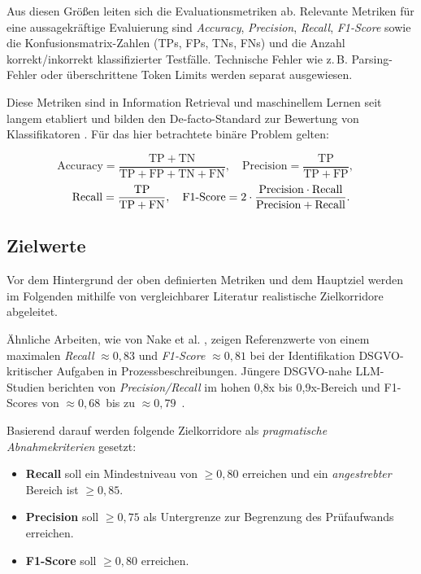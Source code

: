 Aus diesen Größen leiten sich die Evaluationsmetriken ab. Relevante Metriken für eine aussagekräftige Evaluierung sind \emph{Accuracy}, \emph{Precision}, \emph{Recall}, \emph{F1-Score} sowie die Konfusionsmatrix-Zahlen (\acp{TP}, \acp{FP}, \acp{TN}, \acp{FN}) und die Anzahl korrekt/inkorrekt klassifizierter Testfälle. Technische Fehler wie z.\,B. Parsing-Fehler oder überschrittene Token Limits werden separat ausgewiesen.

Diese Metriken sind in Information Retrieval und maschinellem Lernen seit langem etabliert und bilden den De-facto-Standard zur Bewertung von Klassifikatoren \cite{manning2008ir, nake2023towards, sokolova2009measureclassification}. Für das hier betrachtete binäre Problem gelten:

\[
    \mathrm{Accuracy}=\frac{\mathrm{TP}+\mathrm{TN}}{\mathrm{TP}+\mathrm{FP}+\mathrm{TN}+\mathrm{FN}},\quad
    \mathrm{Precision}=\frac{\mathrm{TP}}{\mathrm{TP}+\mathrm{FP}},\quad
\]
\vspace{0.5em}
\[
    \mathrm{Recall}=\frac{\mathrm{TP}}{\mathrm{TP}+\mathrm{FN}},\quad
    \mathrm{F1\mathchar`-Score}=2\cdot\frac{\mathrm{Precision}\cdot \mathrm{Recall}}{\mathrm{Precision}+\mathrm{Recall}}.
\]

\subsection*{Zielwerte}

Vor dem Hintergrund der oben definierten Metriken und dem Hauptziel werden im Folgenden mithilfe von vergleichbarer Literatur realistische Zielkorridore abgeleitet.

Ähnliche Arbeiten, wie von Nake et al. \cite{nake2023towards}, zeigen Referenzwerte von einem maximalen \emph{Recall} $\approx 0{,}83$ und \emph{F1-Score} $\approx 0{,}81$ bei der Identifikation \ac{DSGVO}-kritischer Aufgaben in Prozessbeschreibungen. Jüngere \ac{DSGVO}-nahe \ac{LLM}-Studien berichten von \emph{Precision/Recall} im hohen 0{,}8x bis 0{,}9x-Bereich \cite{hooda2024policylr} und F1-Scores von $\approx 0{,}68$~bis zu $\approx 0{,}79$~\cite{schwerin2024systematic}.

Basierend darauf werden folgende Zielkorridore als \emph{pragmatische Abnahmekriterien} gesetzt:

\begin{itemize}
    \item \textbf{Recall} soll ein Mindestniveau von $\geq 0{,}80$ erreichen und ein \emph{angestrebter} Bereich ist $\geq 0{,}85$.
    \item \textbf{Precision} soll $\geq 0{,}75$ als Untergrenze zur Begrenzung des Prüfaufwands erreichen.
    \item \textbf{F1-Score} soll $\geq 0{,}80$ erreichen.
\end{itemize}

